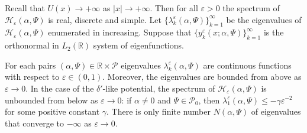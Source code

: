 \documentclass[11pt,english]{amsart}
\begin{document}
Recall that $U(x)\to +\infty$ as ${\left\vert{x}\right\vert}\to +\infty$. Then for all $\varepsilon>0$ the spectrum of $\mathcal{H}_{\varepsilon}(\alpha,\Psi)$ is real, discrete and simple.
Let $\{\lambda_k^\varepsilon(\alpha, \Psi)\}_{k=1}^\infty$ be the eigenva\-lues of  $\mathcal{H}_{\varepsilon}(\alpha,\Psi)$ enumerated in increasing. Suppose that $\{y_k^\varepsilon(x;\alpha, \Psi)\}_{k=1}^\infty$ is the orthonormal in $L_2(\mathbb{R})$ system of eigenfunctions.
\begin{g_theorem}\label{TheoremNeg}
For each pairs $(\alpha,\Psi)\in \mathbb{R}\times \mathcal{P}$  eigenvalues  $\lambda_k^\varepsilon(\alpha, \Psi)$ are continuous functions with respect to $\varepsilon \in (0,1)$.
Moreover, the eigenvalues are bounded from above as $\varepsilon\to 0$.
In the case of the $\delta'$-like potential, the spectrum of $\mathcal{H_{\varepsilon}}(\alpha,\Psi)$ is unbounded from below as $\varepsilon\to 0$: if $\alpha\neq 0$ and $\Psi\in \mathcal{P}_0$, then $\lambda_1^\varepsilon(\alpha, \Psi)\leq -\gamma\varepsilon^{-2}$
for some positive constant $\gamma$. There is only finite number $N(\alpha,\Psi)$ of eigenvalues that converge to $-\infty$ as $\varepsilon\to 0$.
\end{g_theorem}
\end{document}
